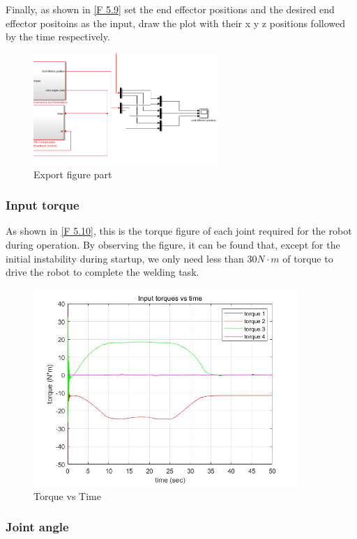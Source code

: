 Finally, as shown in \autoref{F 5.9} set the end effector positions and the desired end effector positoins as the input, draw the plot with their x y z positions followed by the time respectively.

\begin{figure}[htbp]
	\centering
	\includegraphics[width=7cm]{./fig/re.png}
	\caption{Export figure part}
	\label{F 5.9}
\end{figure}


\subsubsection*{Input torque}


As shown in \autoref{F 5.10}, this is the torque figure of each joint required for the robot during operation. By observing the figure, it can be found that, except for the initial instability during startup, we only need less than $30N\cdot m$ of torque to drive the robot to complete the welding task.

\begin{figure}[htbp]
	\centering
	\includegraphics[width=10cm]{./fig/3.jpg}
	\caption{Torque vs Time}
	\label{F 5.10}
\end{figure}

\subsubsection*{Joint angle}




